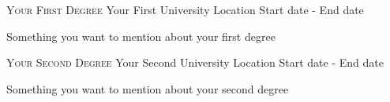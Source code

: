 


\begin{cventries}


\cventry
{\textsc{\footnotesize{Your First Degree}}} %
{Your First University} %
{Location} %
{Start date - End date} %
{ %
\begin{cvitems}
\item {Something you want to mention about your first degree}
\end{cvitems}
}

\cventry
{\textsc{\footnotesize{Your Second Degree}}} %
{Your Second University} %
{Location} %
{Start date - End date} %
{ %
\begin{cvitems}
\item {Something you want to mention about your second degree}
\end{cvitems}
}

\end{cventries}